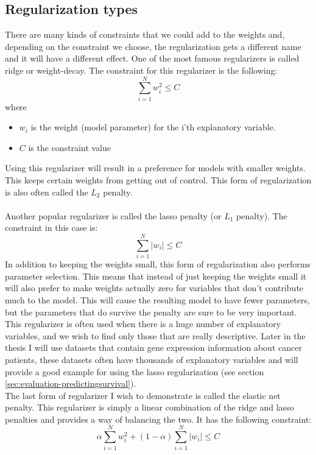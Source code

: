 \subsection{Regularization types}
There are many kinds of constraints that we could add to the weights and, depending on the constraint we choose, the regularization gets a different name and it will have a different effect. One of the most famous regularizers is called ridge or weight-decay\cite{friedman2010regularization}. The constraint for this regularizer is the following:
$$
\sum_{i=1}^{N}w_{i}^{2} \leq C
$$
where
\begin{itemize}
	\item $w_{i}$ is the weight (model parameter) for the i'th explanatory variable.
	\item $C$ is the constraint value
\end{itemize}
Using this regularizer will result in a preference for models with smaller weights. This keeps certain weights from getting out of control. This form of regularization is also often called the $L_{2}$ penalty. \\ \\
\label{insec:glm-lasso}
Another popular regularizer is called the lasso penalty (or $L_{1}$ penalty)\cite{friedman2010regularization}. The constraint in this case is:
$$
\sum_{i=1}^{N}\lvert w_{i}\rvert \leq C
$$
In addition to keeping the weights small, this form of regularization also performs parameter selection. This means that instead of just keeping the weights small it will also prefer to make weights actually zero for variables that don't contribute much to the model. This will cause the resulting model to have fewer parameters, but the parameters that do survive the penalty are sure to be very important. This regularizer is often used when there is a huge number of explanatory variables, and we wish to find only those that are really descriptive. Later in the thesis I will use datasets that contain gene expression information about cancer patients, these datasets often have thousands of explanatory variables and will provide a good example for using the lasso regularization (see section \ref{sec:evaluation-predictingsurvival}). \\
The last form of regularizer I wish to demonstrate is called the elastic net penalty. This regularizer is simply a linear combination of the ridge and lasso penalties and provides a way of balancing the two. It has the following constraint:
$$
\alpha \sum_{i=1}^{N}w_{i}^{2} + (1-\alpha)\sum_{i=1}^{N}\lvert w_{i}\rvert \leq C
$$
